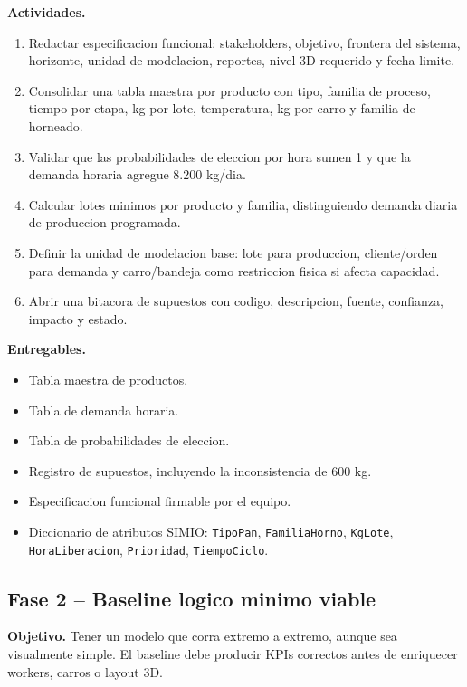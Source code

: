 \documentclass[12pt]{article}
\newcommand{\archivo}[1]{\texttt{#1}}
\begin{document}
\textbf{Actividades.}
\begin{enumerate}
  \item Redactar especificacion funcional: stakeholders, objetivo, frontera del sistema, horizonte, unidad de modelacion, reportes, nivel 3D requerido y fecha limite.
  \item Consolidar una tabla maestra por producto con tipo, familia de proceso, tiempo por etapa, kg por lote, temperatura, kg por carro y familia de horneado.
  \item Validar que las probabilidades de eleccion por hora sumen 1 y que la demanda horaria agregue 8.200 kg/dia.
  \item Calcular lotes minimos por producto y familia, distinguiendo demanda diaria de produccion programada.
  \item Definir la unidad de modelacion base: lote para produccion, cliente/orden para demanda y carro/bandeja como restriccion fisica si afecta capacidad.
  \item Abrir una bitacora de supuestos con codigo, descripcion, fuente, confianza, impacto y estado.
\end{enumerate}

\textbf{Entregables.}
\begin{itemize}
  \item Tabla maestra de productos.
  \item Tabla de demanda horaria.
  \item Tabla de probabilidades de eleccion.
  \item Registro de supuestos, incluyendo la inconsistencia de 600 kg.
  \item Especificacion funcional firmable por el equipo.
  \item Diccionario de atributos SIMIO: \archivo{TipoPan}, \archivo{FamiliaHorno}, \archivo{KgLote}, \archivo{HoraLiberacion}, \archivo{Prioridad}, \archivo{TiempoCiclo}.
\end{itemize}

\subsection{Fase 2 -- Baseline logico minimo viable}

\textbf{Objetivo.} Tener un modelo que corra extremo a extremo, aunque sea visualmente simple. El baseline debe producir KPIs correctos antes de enriquecer workers, carros o layout 3D.
\end{document}
